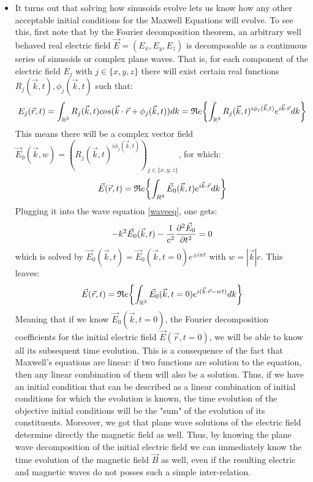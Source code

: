 \documentclass[11pt, a4paper, twoside]{article} %
\newcommand{\R}{\mathbb{R}} %
\begin{document}
\begin{itemize}
\item It turns out that solving how sinusoids evolve lets us know how any other acceptable initial conditions for the Maxwell Equations will evolve. To see this, first note that by the Fourier decomposition theorem, an arbitrary well behaved real electric field $\vec{E}=(E_x,E_y,E_z)$ is decomposable as a continuous series of sinusoids or complex plane waves. That is, for each component of the electric field $E_j$ with $j\in\{x,y,z\}$ there will exist certain real functions $R_j(\vec{k},t),\phi_j(\vec{k},t)$ such that:\vspace{-0.2cm}
\begin{equation}
E_j(\vec{r},t)=\int_{\R^3} R_j(\vec{k},t)cos(\vec{k}\cdot\vec{r}+\phi_j(\vec{k},t))dk
=\mathfrak{R}e\qty{\int_{\R^3}R_j(\vec{k},t)^{i\phi_j(\vec{k},t)}e^{i\vec{k}\cdot\vec{r}}dk}\vspace{-0.2cm}
\end{equation}
This means there will be a complex vector field $\vec{E}_0(\vec{k},w)=(R_j(\vec{k},t)^{i\phi_j(\vec{k},t)})_{j\in\{x,y,z\}}$, for which:
\begin{equation}
\vec{E}(\vec{r},t)=\mathfrak{R}e\qty{\int_{R^4}\vec{E}_0(\vec{k},t)e^{i\vec{k}\cdot\vec{r}}dk}
\end{equation}
Plugging it into the wave equation \eqref{waveeq}, one gets:\vspace{-0.2cm}
\begin{equation}
-k^2\vec{E}_0(\vec{k},t)-\frac{1}{c^2}\pdv[2]{\vec{E}_0}{t}=0
\end{equation}
which is solved by $\vec{E}_0(\vec{k},t)=\vec{E}_0(\vec{k},t=0)e^{\pm iwt}$ with $w=|\vec{k}|c$. This leaves:
\begin{equation}
\vec{E}(\vec{r},t)=\mathfrak{R}e\qty{\int_{\R^3}\vec{E}_0(\vec{k},t=0)e^{i(\vec{k}\cdot\vec{r}-wt)}dk}
\end{equation}
Meaning that if we know $\vec{E}_0(\vec{k},t=0)$, the Fourier decomposition coefficients for the initial electric field $\vec{E}(\vec{r},t=0)$, we will be able to know all its subsequent time evolution. This is a consequence of the fact that Maxwell's equations are linear: if two functions are solution to the equation, then any linear combination of them will also be a solution. Thus, if we have an initial condition that can be described as a linear combination of initial conditions for which the evolution is known, the time evolution of the objective initial conditions will be the "sum" of the evolution of its constituents. Moreover, we got that plane wave solutions of the electric field determine directly the magnetic field as well. Thus, by knowing the plane wave decomposition of the initial electric field we can immediately know the time evolution of the magnetic field $\vec{B}$ as well, even if the resulting electric and magnetic waves do not posses such a simple inter-relation.



\end{itemize}
\end{document}
